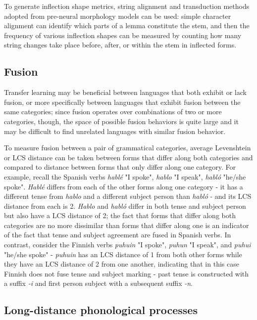 To generate inflection shape metrics, string alignment and transduction methods adopted from pre-neural morphology models can be used: simple character alignment can identify which parts of a lemma constitute the stem, and then the frequency of various inflection shapes can be measured by counting how many string changes take place before, after, or within the stem in inflected forms.

\subsection{Fusion}

Transfer learning may be beneficial between languages that both exhibit or lack fusion, or more specifically between languages that exhibit fusion between the same categories; since fusion operates over combinations of two or more categories, though, the space of possible fusion behaviors is quite large and it may be difficult to find unrelated languages with similar fusion behavior. 

To measure fusion between a pair of grammatical categories, average Levenshtein or LCS distance can be taken between forms that differ along both categories and compared to distance between forms that only differ along one category. For example, recall the Spanish verbs \textit{hablé} "I spoke", \textit{hablo} "I speak", \textit{habló} "he/she spoke". \textit{Hablé} differs from each of the other forms along one category - it has a different tense from \textit{hablo} and a different subject person than \textit{habló} - and its LCS distance from each is 2. \textit{Hablo} and \textit{habló} differ in both tense and subject person but also have a LCS distance of 2; the fact that forms that differ along both categories are no more dissimilar than forms that differ along one is an indicator of the fact that tense and subject agreement are fused in Spanish verbs. In contrast, consider the Finnish verbs \textit{puhuin} "I spoke", \textit{puhun} "I speak", and \textit{puhui} "he/she spoke" - \textit{puhuin} has an LCS distance of 1 from both other forms while they have an LCS distance of 2 from one another, indicating that in this case Finnish does not fuse tense and subject marking - past tense is constructed with a suffix \textit{-i} and first person subject with a subsequent suffix \textit{-n}.

\subsection{Long-distance phonological processes}

